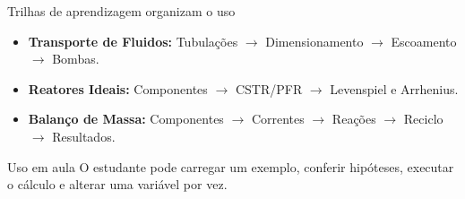 \begin{frame}{Trilhas de aprendizagem organizam o uso}
  \begin{itemize}
    \item \textbf{Transporte de Fluidos:} Tubulações $\rightarrow$ Dimensionamento $\rightarrow$ Escoamento $\rightarrow$ Bombas.
    \item \textbf{Reatores Ideais:} Componentes $\rightarrow$ CSTR/PFR $\rightarrow$ Levenspiel e Arrhenius.
    \item \textbf{Balanço de Massa:} Componentes $\rightarrow$ Correntes $\rightarrow$ Reações $\rightarrow$ Reciclo $\rightarrow$ Resultados.
  \end{itemize}
  \vspace{0.7em}
  \begin{alertblock}{Uso em aula}
    O estudante pode carregar um exemplo, conferir hipóteses, executar o cálculo e alterar uma variável por vez.
  \end{alertblock}
\end{frame}

